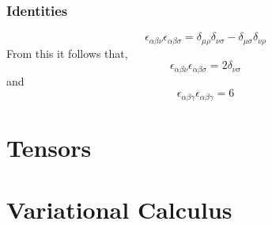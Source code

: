 \subsubsection{Identities}
\begin{equation}
\epsilon_{\alpha \beta \nu}\epsilon_{\alpha \beta \sigma} = \delta_{\mu \rho} \delta_{\nu \sigma} - \delta_{\mu \sigma}\delta_{\nu \rho}
\end{equation}
From this it follows that,
\begin{equation}
\epsilon_{\alpha \beta \nu}\epsilon_{\alpha \beta \sigma} = 2\delta_{\nu \sigma}
\end{equation}
and
\begin{equation}
\epsilon_{\alpha \beta \gamma}\epsilon_{\alpha \beta \gamma} = 6
\end{equation}
\section{Tensors}
\section{Variational Calculus}